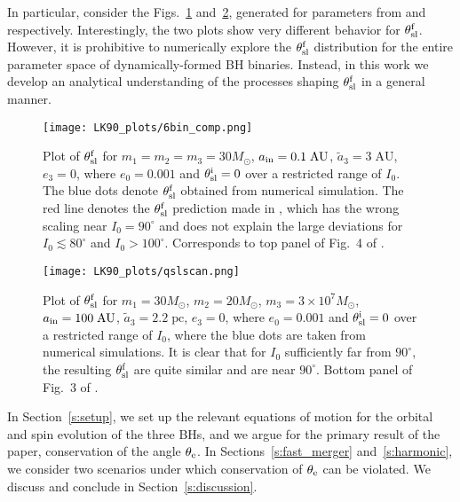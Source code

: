 \documentclass[
        twocolumn,
        twocolappendix
    ]{aastex63}
\begin{document}
In particular, consider the Figs.~\ref{fig:bin_comp} and~\ref{fig:qslscan},
generated for parameters from \citet{bin1} and \citet{bin2} respectively.
Interestingly, the two plots show very different behavior for $\theta_{\rm
sl}^{\rm f}$. However, it is prohibitive to numerically explore the $\theta_{\rm
sl}^{\rm f}$ distribution for the entire parameter space of dynamically-formed
BH binaries. Instead, in this work we develop an analytical understanding of the
processes shaping $\theta_{\rm sl}^{\rm f}$ in a general manner.
\begin{figure}
    \centering
    \texttt{[image: LK90\_plots/6bin\_comp.png]}
    \caption{Plot of $\theta_{\rm sl}^{\rm f}$ for $m_1 = m_2 = m_3 =
    30M_{\odot}$, $a_{\rm in} = 0.1\;\mathrm{AU}$, $\tilde{a}_3 =
    3\;\mathrm{AU}$, $e_3 = 0$, where $e_0 = 0.001$ and $\theta_{\rm sl}^{\rm i}
    = 0$ over a restricted range of $I_0$\citep[analogous to the top panel of
    Fig.~4 in][]{bin1}. The blue dots denote $\theta_{\rm sl}^{\rm f}$ obtained
    from numerical simulation. The red line denotes the $\theta_{\rm sl}^{\rm
    f}$ prediction made in \citet{bin1}, which has the wrong scaling near $I_0 =
    90^\circ$ and does not explain the large deviations for $I_0 \lesssim
    80^\circ$ and $I_0 > 100^\circ$. Corresponds to top panel of Fig.~4 of
    \citet{bin1}.}\label{fig:bin_comp}
\end{figure}
\begin{figure}
    \centering
    \texttt{[image: LK90\_plots/qslscan.png]}
    \caption{Plot of $\theta_{\rm sl}^{\rm f}$ for $m_1 = 30M_{\odot}$, $m_2 =
    20M_{\odot}$, $m_3 = 3 \times 10^7 M_{\odot}$, $a_{\rm in} =
    100\;\mathrm{AU}$, $\tilde{a}_3 = 2.2\;\mathrm{pc}$, $e_3 = 0$, where $e_0 =
    0.001$ and $\theta_{\rm sl}^{\rm i} = 0$ over a restricted range of
    $I_0$\citep[analogous to the bottom-most panel in Fig.~3 of][]{bin2}, where
    the blue dots are taken from numerical simulations. It is clear that for
    $I_0$ sufficiently far from $90^\circ$, the resulting $\theta_{\rm sl}^{\rm
    f}$ are quite similar and are near $90^\circ$\citep{bin2}. Bottom panel of
    Fig.~3 of \citet{bin2}.}\label{fig:qslscan}
\end{figure}

In Section~\ref{s:setup}, we set up the relevant equations of motion for the
orbital and spin evolution of the three BHs, and we argue for the primary result
of the paper, conservation of the angle $\theta_{\rm e}$. In
Sections~\ref{s:fast_merger} and~\ref{s:harmonic}, we consider two scenarios
under which conservation of $\theta_{\rm e}$ can be violated. We discuss and
conclude in Section~\ref{s:discussion}.
\end{document}

